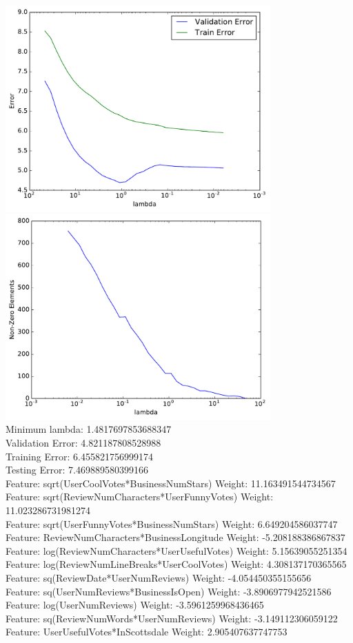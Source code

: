 \documentclass{article}
\newcommand{\1}{\mathbf{1}}
\begin{document}
\includegraphics[width=4in]{ErrorvsLambda.pdf}\\
\includegraphics[width=4in]{NonzerovsLambdaYelp.pdf}\\

Minimum lambda: 1.4817697853688347\\
Validation Error: 4.821187808528988\\
Training Error: 6.455821756999174\\
Testing Error: 7.469889580399166\\

Feature: sqrt(UserCoolVotes*BusinessNumStars) Weight: 11.163491544734567\\
Feature: sqrt(ReviewNumCharacters*UserFunnyVotes) Weight: 11.023286731981274\\
Feature: sqrt(UserFunnyVotes*BusinessNumStars) Weight: 6.649204586037747\\
Feature: ReviewNumCharacters*BusinessLongitude Weight: -5.208188386867837\\
Feature: log(ReviewNumCharacters*UserUsefulVotes) Weight: 5.15639055251354\\
Feature: log(ReviewNumLineBreaks*UserCoolVotes) Weight: 4.308137170365565\\
Feature: sq(ReviewDate*UserNumReviews) Weight: -4.054450355155656\\
Feature: sq(UserNumReviews*BusinessIsOpen) Weight: -3.8906977942521586\\
Feature: log(UserNumReviews) Weight: -3.5961259968436465\\
Feature: sq(ReviewNumWords*UserNumReviews) Weight: -3.149112306059122\\
Feature: UserUsefulVotes*InScottsdale Weight: 2.905407637747753\\
\end{document}
